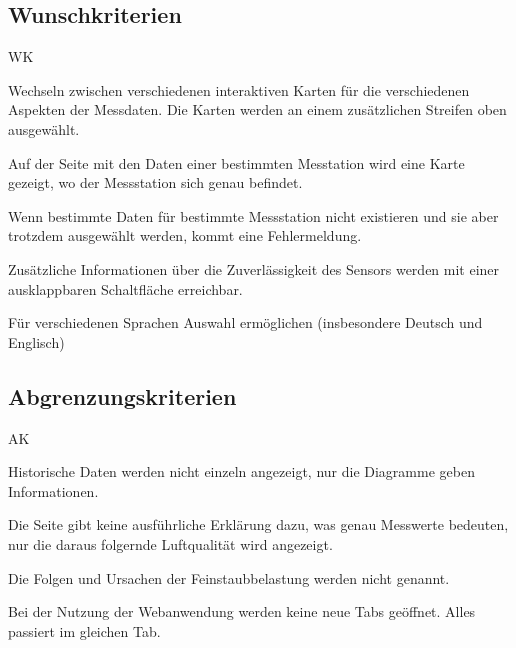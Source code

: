 \newpage
\subsection{Wunschkriterien}
\begin{Kriterien}{WK}

	\item Wechseln zwischen verschiedenen interaktiven Karten für die verschiedenen Aspekten der Messdaten. Die Karten werden an einem zusätzlichen Streifen oben ausgewählt.

	\item Auf der Seite mit den Daten einer bestimmten Messtation wird eine Karte gezeigt, wo der Messstation sich genau befindet. 

	\item Wenn bestimmte Daten für bestimmte Messstation nicht existieren und sie aber trotzdem ausgewählt werden, kommt eine Fehlermeldung.

	\item Zusätzliche Informationen über die Zuverlässigkeit des Sensors werden mit einer ausklappbaren Schaltfläche erreichbar.

	\item Für verschiedenen Sprachen Auswahl ermöglichen (insbesondere Deutsch und Englisch)

\end{Kriterien}

\subsection{Abgrenzungskriterien}
\begin{Kriterien}{AK}

	\item Historische Daten werden nicht einzeln angezeigt, nur die Diagramme geben Informationen.
	
	\item Die Seite gibt keine ausführliche Erklärung dazu, was  genau Messwerte bedeuten, nur die daraus folgernde Luftqualität wird angezeigt. 
	
	\item Die Folgen und Ursachen der Feinstaubbelastung werden nicht genannt.
	
	\item Bei der Nutzung der Webanwendung werden keine neue Tabs geöffnet. Alles passiert im gleichen Tab.
	
\end{Kriterien}
